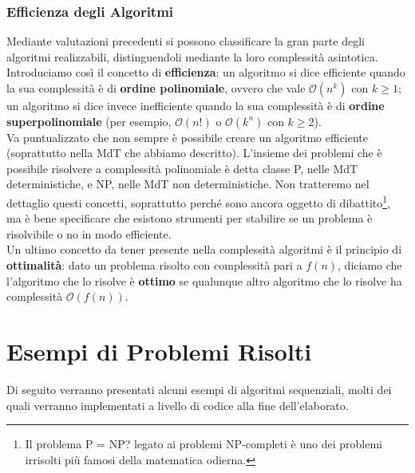 \subsection{Efficienza degli Algoritmi}
Mediante valutazioni precedenti si possono classificare la gran parte degli algoritmi realizzabili, distinguendoli mediante la loro complessità asintotica. Introduciamo così il concetto di \textbf{efficienza}: un algoritmo si dice efficiente quando la sua complessità è di \textbf{ordine polinomiale}, ovvero che vale $\mathcal{O}(n^k)$ con $k \geq 1$; un algoritmo si dice invece inefficiente quando la sua complessità è di \textbf{ordine superpolinomiale} (per esempio, $\mathcal{O}(n!)$ o $\mathcal{O}(k^n)$ con $k \geq 2$).\\
Va puntualizzato che non sempre è possibile creare un algoritmo efficiente (soprattutto nella MdT che abbiamo descritto). L'insieme dei problemi che è possibile risolvere a complessità polinomiale è detta classe P, nelle MdT deterministiche, e NP, nelle MdT non deterministiche. Non tratteremo nel dettaglio questi concetti, soprattutto perché sono ancora oggetto di dibattito\footnote{Il problema P = NP? legato ai problemi NP-completi è uno dei problemi irrisolti più famosi della matematica odierna.}, ma è bene specificare che esistono strumenti per stabilire se un problema è risolvibile o no in modo efficiente.\\
Un ultimo concetto da tener presente nella complessità algoritmi è il principio di \textbf{ottimalità}: dato un problema risolto con complessità pari a $f(n)$, diciamo che l'algoritmo che lo risolve è \textbf{ottimo} se qualunque altro algoritmo che lo risolve ha complessità $\mathcal{O}(f(n))$.
\chapter{Esempi di Problemi Risolti}
Di seguito verranno presentati alcuni esempi di algoritmi sequenziali, molti dei quali verranno implementati a livello di codice alla fine dell'elaborato.
